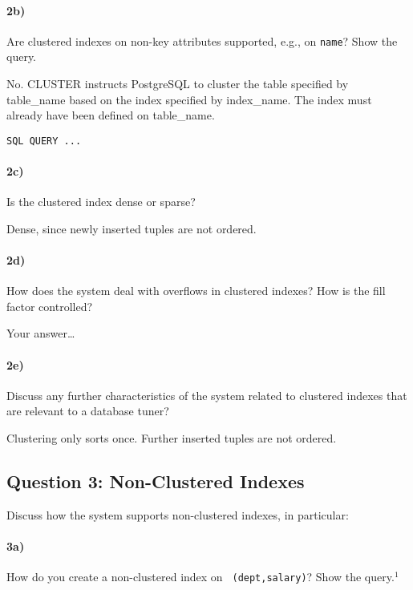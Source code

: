 \documentclass[11pt]{scrartcl}
\begin{document}
\paragraph{2b)} Are clustered indexes on non-key attributes supported, e.g.,
on {\tt name}?  Show the query.

\smallskip

No. CLUSTER instructs PostgreSQL to cluster the table specified by table\_name based on the index specified by index\_name. The index must already have been defined on table\_name.

{\small
\begin{verbatim}
SQL QUERY ...
\end{verbatim}
}

\paragraph{2c)} Is the clustered index dense or sparse?


\smallskip

Dense, since newly inserted tuples are not ordered.

\paragraph{2d)} How does the system deal with overflows in clustered indexes?
How is the fill factor controlled?

\smallskip

Your answer\dots

\paragraph{2e)} Discuss any further characteristics of the system
related to clustered indexes that are relevant to a database
tuner?

\smallskip

Clustering only sorts once. Further inserted tuples are not ordered.

\subsection*{Question 3: Non-Clustered Indexes}

Discuss how the system supports non-clustered indexes, in
particular:

\paragraph{3a)} How do you create a non-clustered index on {\tt
  (dept,salary)}? Show the query.$^1$
\end{document}
